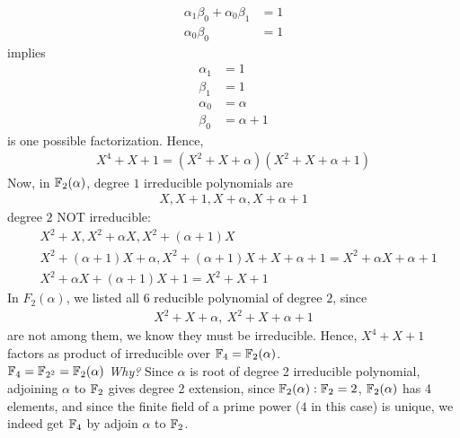 \documentclass{article}
\begin{document}
\begin{homeworkProblem}
\begin{align}
        \alpha_1 \beta_0 + \alpha_0 \beta_1 &= 1\\
        \alpha_0 \beta_0 &= 1
    \end{align}
    implies 
    \begin{align}
        \alpha_1 &= 1 \\
        \beta_1 &= 1\\
        \alpha_0 &= \alpha\\
        \beta_0 &= \alpha + 1
    \end{align}
    is one possible factorization. Hence,
    \begin{align}
        X^4 + X + 1 = (X^2 + X + \alpha)(X^2 +  X + \alpha + 1)
    \end{align}
    Now, in $\mathbb{F}_2 (\alpha)$, degree $1$ irreducible polynomials are
    \begin{align}
        X, X+1, X+\alpha, X + \alpha + 1
    \end{align}
    degree $2$ NOT irreducible:
    \begin{align}
        &X^2 + X, X^2 + \alpha X, X^2 + (\alpha + 1) X\\
        &X^2 + (\alpha+1)X + \alpha, X^2 + (\alpha+1)X + X + \alpha + 1 = X^2 + \alpha X + \alpha + 1\\
        &X^2 + \alpha X + (\alpha + 1)X + 1 = X^2 + X + 1
    \end{align}
    In $F_2(\alpha)$, we listed all 6 reducible polynomial of degree $2$, since 
    \begin{align}
        X^2 + X + \alpha, \ X^2 + X + \alpha + 1
    \end{align}
    are not among them, we know they must be irreducible. Hence,
    $X^4 + X + 1$ factors as product of irreducible over $\mathbb{F}_4 = \mathbb{F}_2 (\alpha)$.\\

    $\mathbb{F}_4 = \mathbb{F}_{2^2} = \mathbb{F}_2 (\alpha)$ \textit{Why?} Since $\alpha$ is root of 
    degree 2 irreducible polynomial, adjoining $\alpha$ to $\mathbb{F}_2$
    gives degree 2 extension, since $\mathbb{F}_2 (\alpha) : \mathbb{F}_2 = 2$,
    $\mathbb{F}_2 (\alpha)$ has 4 elements, and 
    since the finite field of a prime power ($4$ in this case) is unique,
    we indeed get $\mathbb{F}_4$ by adjoin $\alpha$ to $\mathbb{F}_2$.
    
  

\end{homeworkProblem}

\pagebreak
\end{document}
